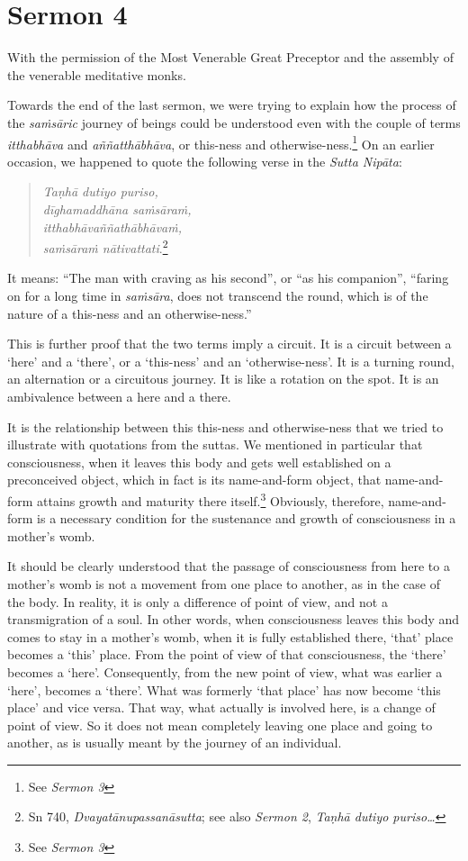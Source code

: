 \chapter{Sermon 4}

\NibbanaOpeningQuote

With the permission of the Most Venerable Great Preceptor and the assembly of the venerable meditative monks.

Towards the end of the last sermon, we were trying to explain how the process of the \emph{saṁsāric} journey of beings could be understood even with the couple of terms \emph{itthabhāva} and \emph{aññatthābhāva}, or this-ness and otherwise-ness.\footnote{See \emph{Sermon 3}} On an earlier occasion, we happened to quote the following verse in the \emph{Sutta Nipāta}:

\begin{quote}
\emph{Taṇhā dutiyo puriso,}\\
\emph{dīghamaddhāna saṁsāraṁ,}\\
\emph{itthabhāvaññathābhāvaṁ,}\\
\emph{saṁsāraṁ nātivattati}.\footnote{Sn 740, \emph{Dvayatānupassanāsutta}; see also \emph{Sermon 2}, \emph{Taṇhā dutiyo puriso\ldots{}}}
\end{quote}

It means: ``The man with craving as his second'', or ``as his companion'', ``faring on for a long time in \emph{saṁsāra}, does not transcend the round, which is of the nature of a this-ness and an otherwise-ness.''

This is further proof that the two terms imply a circuit. It is a circuit between a `here' and a `there', or a `this-ness' and an `otherwise-ness'. It is a turning round, an alternation or a circuitous journey. It is like a rotation on the spot. It is an ambivalence between a here and a there.

It is the relationship between this this-ness and otherwise-ness that we tried to illustrate with quotations from the suttas. We mentioned in particular that consciousness, when it leaves this body and gets well established on a preconceived object, which in fact is its name-and-form object, that name-and-form attains growth and maturity there itself.\footnote{See \emph{Sermon 3}} Obviously, therefore, name-and-form is a necessary condition for the sustenance and growth of consciousness in a mother's womb.

It should be clearly understood that the passage of consciousness from here to a mother's womb is not a movement from one place to another, as in the case of the body. In reality, it is only a difference of point of view, and not a transmigration of a soul. In other words, when consciousness leaves this body and comes to stay in a mother's womb, when it is fully established there, `that' place becomes a `this' place. From the point of view of that consciousness, the `there' becomes a `here'. Consequently, from the new point of view, what was earlier a `here', becomes a `there'. What was formerly `that place' has now become `this place' and vice versa. That way, what actually is involved here, is a change of point of view. So it does not mean completely leaving one place and going to another, as is usually meant by the journey of an individual.

